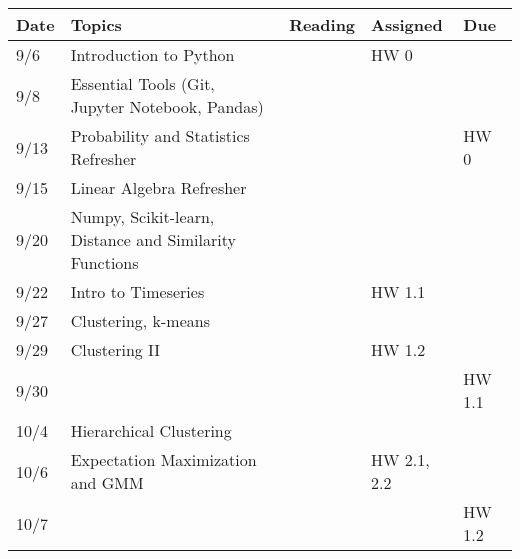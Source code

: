 \documentclass[11pt]{article}
\begin{document}
\small
\begin{centering}
\begin{tabular}{||l|p{3in}|l|l|l||}
\hline\hline
Date & Topics  & Reading & Assigned & Due  \\
\hline\hline
9/6 & Introduction to Python &  &  HW 0 & \\
9/8 & Essential Tools (Git, Jupyter Notebook, Pandas) & & & \\

\hline
9/13 & Probability and Statistics Refresher & &  & HW 0 \\
9/15 & Linear Algebra Refresher & & & \\
\hline
 9/20 & Numpy, Scikit-learn, Distance and Similarity Functions & &  & \\
9/22 & Intro to Timeseries & & HW 1.1& \\ 
\hline

9/27 & Clustering, k-means & & & \\
9/29 & Clustering II & &HW 1.2  & \\ 
9/30 &&&& HW 1.1 \\
\hline

10/4 & Hierarchical Clustering & & & \\  
10/6 & Expectation Maximization and GMM & & HW 2.1, 2.2 & \\ 
10/7 &&&& HW 1.2 \\
\hline


\end{tabular}
\end{centering}
\end{document}
